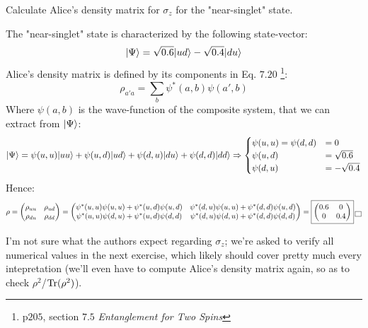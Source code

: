 \documentclass[solutions.tex]{subfiles}
\begin{document}
\maketitle
\begin{exercise} Calculate Alice's density matrix for
$\sigma_z$ for the "near-singlet" state.
\end{exercise}
The "near-singlet" state is characterized by the following state-vector:
\[
	\ket{\Psi} = \sqrt{0.6}\ket{ud} - \sqrt{0.4}\ket{du}
\]
Alice's density matrix is defined by its components in Eq. $7.20$%
\footnote{p$205$, section $7.5$ \textit{Entanglement for Two Spins}}:
\[
	\rho_{a'a} = \sum_b\psi^*(a,b)\psi(a',b)
\]
Where $\psi(a,b)$ is the wave-function of the composite system, that we
can extract from $\ket{\Psi}$:
\[
	\ket{\Psi} = \psi(u,u)\ket{uu}
		+ \psi(u,d)\ket{ud}
		+ \psi(d,u)\ket{du}
		+ \psi(d,d)\ket{dd}
	\Rightarrow \begin{cases}
		\psi(u,u) = \psi(d,d) &= 0 \\
		\psi(u,d) &= \sqrt{0.6} \\
		\psi(d,u) &= -\sqrt{0.4} \\
	\end{cases}
\]
Hence:
\[
	\rho = \begin{pmatrix}
		\rho_{uu} & \rho_{ud} \\
		\rho_{du} & \rho_{dd} \\
	\end{pmatrix} = \begin{pmatrix}
		\psi^*(u,u)\psi(u,u)+\psi^*(u,d)\psi(u,d)
			& \psi^*(d,u)\psi(u,u)+\psi^*(d,d)\psi(u,d) \\
		\psi^*(u,u)\psi(d,u) + \psi^*(u,d)\psi(d,d)
			& \psi^*(d,u)\psi(d,u) + \psi^*(d,d)\psi(d,d)
	\end{pmatrix} = \boxed{\begin{pmatrix}
		0.6 & 0   \\
		0   & 0.4 \\
	\end{pmatrix}} \qed
\]

\begin{remark} I'm not sure what the authors expect regarding
$\sigma_z$; we're asked to verify all numerical values in
the next exercise, which likely should cover pretty much every
intepretation (we'll even have to compute Alice's density matrix
again, so as to check $\rho^2$/$\Tr(\rho^2)$).
\end{remark}
\end{document}

